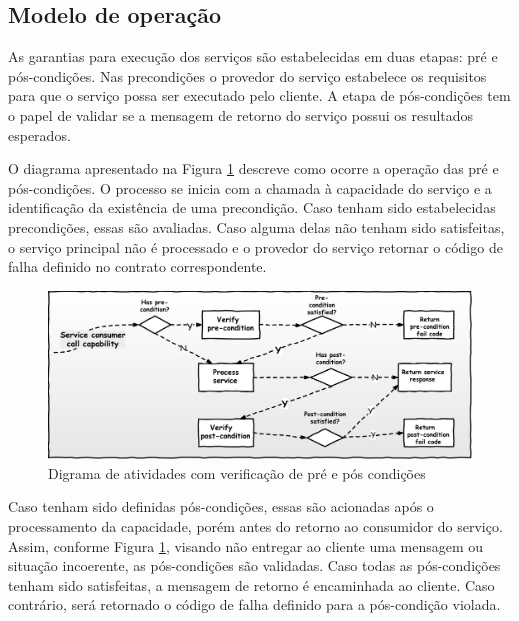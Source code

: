 \vspace{-6mm}

\subsection{Modelo de operação}
\vspace{-6mm}

As garantias para execução dos serviços são estabelecidas em duas etapas: pré e
pós-condições. Nas precondições o provedor do serviço estabelece os requisitos
para que o serviço possa ser executado pelo cliente. A etapa de pós-condições
tem o papel de validar se a mensagem de retorno do serviço possui os resultados
esperados.

O diagrama apresentado na Figura \ref{FigServiceDbC} descreve como ocorre a
operação das pré e pós-condições. O processo se inicia com a chamada à capacidade do serviço e a
identificação da existência de uma precondição. Caso tenham sido estabelecidas 
precondições, essas são avaliadas. Caso alguma delas não tenham sido
satisfeitas, o serviço principal não é processado e o provedor do serviço
retornar o código de falha definido no contrato correspondente.


\begin{figure}[!htb]
\centering
\includegraphics[width=140mm,trim = 0mm 0mm 0mm
0mm,clip]{img/FluxoDbcCondicoes.pdf}
\caption{Digrama de atividades com verificação de pré e pós condições}
\label{FigServiceDbC}
\end{figure}

Caso tenham sido definidas pós-condições, essas são acionadas após o
processamento da capacidade, porém antes do retorno ao consumidor do serviço.
Assim, conforme Figura \ref{FigServiceDbC}, visando não entregar ao cliente uma
mensagem ou situação incoerente, as pós-condições são validadas. Caso todas as
pós-condições tenham sido satisfeitas, a mensagem de retorno é encaminhada ao
cliente. Caso contrário, será retornado o código de falha definido para a
pós-condição violada.

